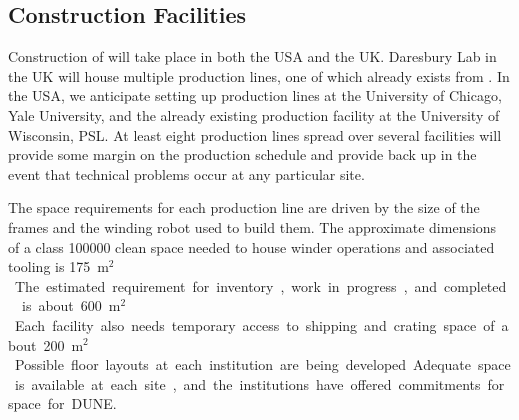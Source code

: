 \subsection{Construction Facilities}
\label{sec:fdsp-apa-prod-facility}

Construction of   will take place in both the USA and the UK. Daresbury Lab  in the UK will house multiple production lines, one of which already exists from . In the USA, we anticipate setting up production lines  at the University of Chicago, Yale University, and the already existing production facility at the University of Wisconsin, PSL. At least eight  production lines spread over several facilities will provide some margin on the production schedule and provide back up in the event that technical problems occur at any particular site. 

The space requirements for each production line are driven by the size of the  frames and the winding robot used to build them. The approximate dimensions of a class \num{100000} clean space needed to house winder operations and associated tooling is \SI{175}{m$^2$}. The estimated requirement for inventory, work in progress, and completed  is about \SI{600}{m$^2$}. Each facility  also needs temporary access to shipping and crating space of about \SI{200}{m$^2$}. Possible floor layouts at each institution are being developed. Adequate space is available at each site, and the institutions have offered commitments for space for DUNE. 


